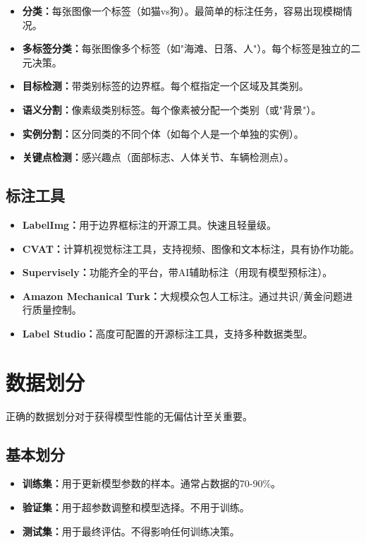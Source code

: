 \begin{itemize}
    \item \textbf{分类：}每张图像一个标签（如猫vs狗）。最简单的标注任务，容易出现模糊情况。
    \item \textbf{多标签分类：}每张图像多个标签（如"海滩、日落、人"）。每个标签是独立的二元决策。
    \item \textbf{目标检测：}带类别标签的边界框。每个框指定一个区域及其类别。
    \item \textbf{语义分割：}像素级类别标签。每个像素被分配一个类别（或"背景"）。
    \item \textbf{实例分割：}区分同类的不同个体（如每个人是一个单独的实例）。
    \item \textbf{关键点检测：}感兴趣点（面部标志、人体关节、车辆检测点）。
\end{itemize}

\subsection{标注工具}

\begin{itemize}
    \item \textbf{LabelImg：}用于边界框标注的开源工具。快速且轻量级。
    \item \textbf{CVAT：}计算机视觉标注工具，支持视频、图像和文本标注，具有协作功能。
    \item \textbf{Supervisely：}功能齐全的平台，带AI辅助标注（用现有模型预标注）。
    \item \textbf{Amazon Mechanical Turk：}大规模众包人工标注。通过共识/黄金问题进行质量控制。
    \item \textbf{Label Studio：}高度可配置的开源标注工具，支持多种数据类型。
\end{itemize}

\section{数据划分}

正确的数据划分对于获得模型性能的无偏估计至关重要。

\subsection{基本划分}

\begin{itemize}
    \item \textbf{训练集：}用于更新模型参数的样本。通常占数据的70-90\%。
    \item \textbf{验证集：}用于超参数调整和模型选择。不用于训练。
    \item \textbf{测试集：}用于最终评估。不得影响任何训练决策。
\end{itemize}

